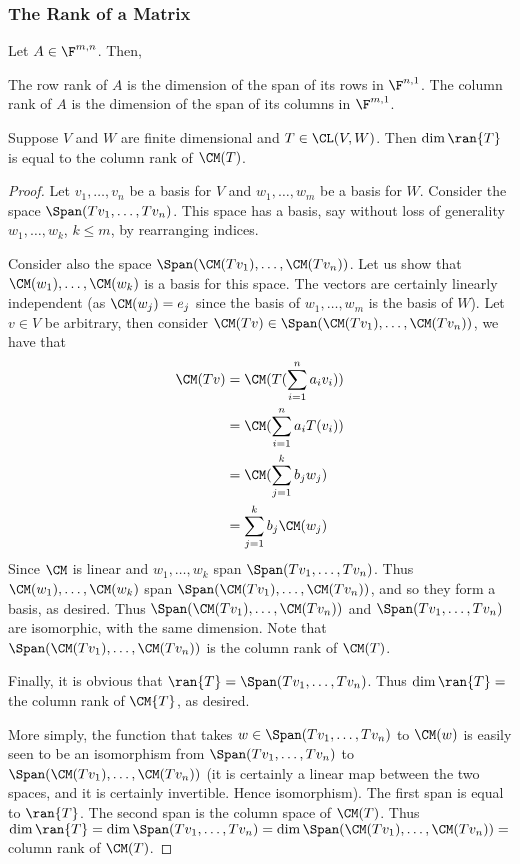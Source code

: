 \documentclass{article}
\begin{document}
\subsubsection{The Rank of a Matrix}
  \begin{defn}
    Let $A \in \F^{m, n}$. Then,
    \begin{enumerate}[label=\alph*)]
      \ii 
        The row rank of $A$ is the dimension of the span of its rows in $\F^{n, 1}$.
      \ii 
        The column rank of $A$ is the dimension of the span of its columns in $\F^{m, 1}$.
    \end{enumerate}
  \end{defn}
  \begin{prop}
    Suppose $V$ and $W$ are finite dimensional and $T \in \CL(V, W)$. Then $\dim{\ran{T}}$ is equal to the column rank of $\CM(T)$.
  \end{prop}
  \begin{proof}
    Let $v_1, \dots, v_n$ be a basis for $V$ and $w_1, \dots, w_m$ be a basis for $W$. Consider the space $\Span(Tv_1, \dots, Tv_n)$. This space has a basis, say without loss of generality
    $w_1, \dots, w_k$, $k \leq m$, by rearranging indices. 

    Consider also the space $\Span(\CM(Tv_1), \dots, \CM(Tv_n))$. Let us show that $\CM(w_1), \dots, \CM(w_k)$ is a basis for this space. The vectors are certainly linearly independent (as
    $\CM(w_j) = e_j$ since the basis of $w_1, \dots, w_m$ is the basis of $W$). Let $v \in V$ be arbitrary, then consider $\CM(Tv) \in \Span(\CM(Tv_1), \dots, \CM(Tv_n))$, we have that
    \begin{align*}
      \CM(Tv) & = \CM(T(\sum_{i = 1}^{n}a_iv_i)) \\
      & = \CM(\sum_{i = 1}^{n}a_iT(v_i)) \\
      & = \CM(\sum_{j = 1}^{k}b_jw_j) \\
      & = \sum_{j = 1}^{k}b_j\CM(w_j) \\
    \end{align*}
    Since $\CM$ is linear and $w_1, \dots, w_k$ span $\Span(Tv_1, \dots, Tv_n)$. Thus $\CM(w_1), \dots, \CM(w_k)$ span $\Span(\CM(Tv_1), \dots, \CM(Tv_n))$, and so they form a basis, as
    desired. Thus $\Span(\CM(Tv_1), \dots, \CM(Tv_n))$ and $\Span(Tv_1, \dots, Tv_n)$ are isomorphic, with the same dimension. Note that $\Span(\CM(Tv_1), \dots, \CM(Tv_n))$ is the column
    rank of $\CM(T)$. 

    Finally, it is obvious that $\ran{T} = \Span(Tv_1, \dots, Tv_n)$. Thus $\dim\ran{T} = $ the column rank of $\CM{T}$, as desired.


    More simply, the function that takes $w \in \Span(Tv_1, \dots, Tv_n)$ to $\CM(w)$ is easily seen to be an isomorphism from $\Span(Tv_1, \dots, Tv_n)$ to $\Span(\CM(Tv_1), \dots,
    \CM(Tv_n))$ (it is certainly a linear map between the two spaces, and it is certainly invertible. Hence isomorphism). The first span  is equal to $\ran{T}$. The second span is the column
    space of $\CM(T)$. Thus $\dim\ran{T} = \dim\Span(Tv_1, \dots, Tv_n) = \dim\Span(\CM(Tv_1), \dots,
    \CM(Tv_n)) = $ column rank of $\CM(T)$.
  \end{proof}
\end{document}
